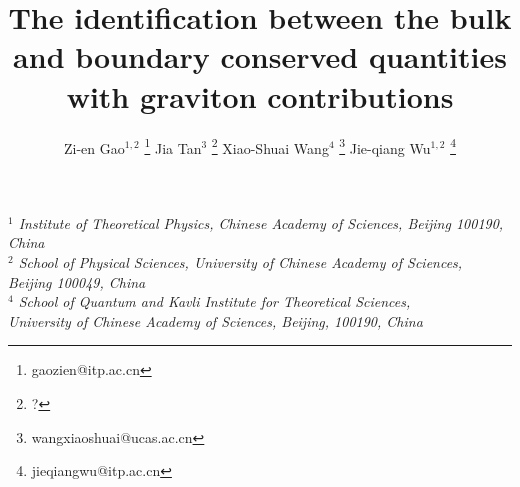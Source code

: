 \title{\textbf{The identification between the bulk and boundary conserved quantities with graviton contributions}}
\author{Zi-en Gao${}^{1,2}$ \footnote{gaozien@itp.ac.cn}
  Jia Tan${}^{3}$ \footnote{?}
  Xiao-Shuai Wang${}^{4}$ \footnote{wangxiaoshuai@ucas.ac.cn}
  Jie-qiang Wu${}^{1,2}$ \footnote{jieqiangwu@itp.ac.cn}
}
\date{}
\maketitle

\begin{center}
  {\it
  $^{1}$ Institute of Theoretical Physics, Chinese Academy of Sciences, Beijing 100190, China\\
  $^{2}$ School of Physical Sciences, University of Chinese Academy of Sciences, \\ Beijing 100049, China\\
  $^{4}$ School of Quantum and Kavli Institute for Theoretical Sciences, \\
  University of Chinese Academy of Sciences, Beijing, 100190, China
  }
\end{center}

